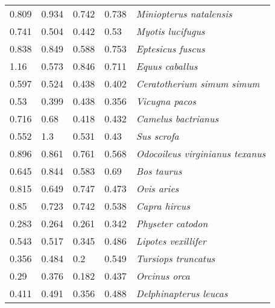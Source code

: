 \begin{tabular}{lllll}
          0.809 &           0.934 &           0.742 &           0.738 &               \textit{Miniopterus natalensis} \\
          0.741 &           0.504 &           0.442 &            0.53 &                     \textit{Myotis lucifugus} \\
          0.838 &           0.849 &           0.588 &           0.753 &                     \textit{Eptesicus fuscus} \\
           1.16 &           0.573 &           0.846 &           0.711 &                       \textit{Equus caballus} \\
          0.597 &           0.524 &           0.438 &           0.402 &            \textit{Ceratotherium simum simum} \\
           0.53 &           0.399 &           0.438 &           0.356 &                        \textit{Vicugna pacos} \\
          0.716 &            0.68 &           0.418 &           0.432 &                   \textit{Camelus bactrianus} \\
          0.552 &             1.3 &           0.531 &            0.43 &                           \textit{Sus scrofa} \\
          0.896 &           0.861 &           0.761 &           0.568 &       \textit{Odocoileus virginianus texanus} \\
          0.645 &           0.844 &           0.583 &            0.69 &                           \textit{Bos taurus} \\
          0.815 &           0.649 &           0.747 &           0.473 &                           \textit{Ovis aries} \\
           0.85 &           0.723 &           0.742 &           0.538 &                         \textit{Capra hircus} \\
          0.283 &           0.264 &           0.261 &           0.342 &                     \textit{Physeter catodon} \\
          0.543 &           0.517 &           0.345 &           0.486 &                   \textit{Lipotes vexillifer} \\
          0.356 &           0.484 &             0.2 &           0.549 &                   \textit{Tursiops truncatus} \\
           0.29 &           0.376 &           0.182 &           0.437 &                         \textit{Orcinus orca} \\
          0.411 &           0.491 &           0.356 &           0.488 &                \textit{Delphinapterus leucas} \\

\end{tabular}
